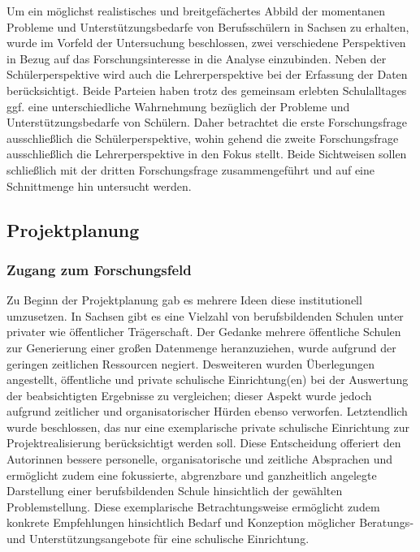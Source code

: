 Um ein möglichst realistisches und breitgefächertes Abbild der momentanen Probleme und Unterstützungsbedarfe von Berufsschülern in Sachsen zu erhalten, wurde im Vorfeld der Untersuchung beschlossen, zwei verschiedene Perspektiven in Bezug auf das Forschungsinteresse in die Analyse einzubinden. Neben der Schülerperspektive wird auch die Lehrerperspektive bei der Erfassung der Daten berücksichtigt. Beide Parteien haben trotz des gemeinsam erlebten Schulalltages ggf. eine unterschiedliche Wahrnehmung bezüglich der Probleme und Unterstützungsbedarfe von Schülern. Daher betrachtet die erste Forschungsfrage ausschließlich die Schülerperspektive, wohin gehend die zweite Forschungsfrage ausschließlich die Lehrerperspektive in den Fokus stellt. Beide Sichtweisen sollen schließlich mit der dritten Forschungsfrage zusammengeführt und auf eine Schnittmenge hin untersucht werden.

\subsection{Projektplanung}
\label{sec:Projektplanung}

\subsubsection{Zugang zum Forschungsfeld}
\label{sec:ZugangZumForschungsfeld}

Zu Beginn der Projektplanung gab es mehrere Ideen diese institutionell umzusetzen. In Sachsen gibt es eine Vielzahl von berufsbildenden Schulen unter privater wie öffentlicher Trägerschaft. Der Gedanke mehrere öffentliche Schulen zur Generierung einer großen Datenmenge heranzuziehen, wurde aufgrund der geringen zeitlichen Ressourcen negiert. Desweiteren wurden Überlegungen angestellt, öffentliche und private schulische Einrichtung(en) bei der Auswertung der beabsichtigten Ergebnisse zu vergleichen; dieser Aspekt wurde jedoch aufgrund zeitlicher und organisatorischer Hürden ebenso verworfen. Letztendlich wurde beschlossen, das nur eine exemplarische private schulische Einrichtung zur Projektrealisierung berücksichtigt werden soll. Diese Entscheidung offeriert den Autorinnen bessere personelle, organisatorische und zeitliche Absprachen und ermöglicht zudem eine fokussierte, abgrenzbare und ganzheitlich angelegte Darstellung einer berufsbildenden Schule hinsichtlich der gewählten Problemstellung. Diese exemplarische  Betrachtungsweise ermöglicht zudem konkrete Empfehlungen hinsichtlich Bedarf und Konzeption möglicher Beratungs- und Unterstützungsangebote für eine schulische Einrichtung.


